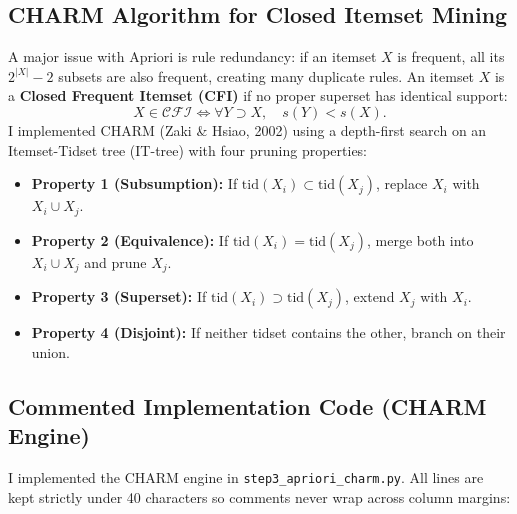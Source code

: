 \documentclass[10pt,journal]{IEEEtran}
\begin{document}
\subsection{CHARM Algorithm for Closed Itemset Mining}
A major issue with Apriori is rule redundancy: if an itemset $X$ is frequent, all its $2^{|X|} - 2$ subsets are also frequent, creating many duplicate rules. An itemset $X$ is a \textbf{Closed Frequent Itemset (CFI)} if no proper superset has identical support:
\begin{equation}
    X \in \mathcal{CFI} \iff \forall Y \supset X, \quad s(Y) < s(X).
\end{equation}
I implemented CHARM (Zaki \& Hsiao, 2002) using a depth-first search on an Itemset-Tidset tree (IT-tree) with four pruning properties:
\begin{itemize}
    \item \textbf{Property 1 (Subsumption):} If $\mathrm{tid}(X_i) \subset \mathrm{tid}(X_j)$, replace $X_i$ with $X_i \cup X_j$.
    \item \textbf{Property 2 (Equivalence):} If $\mathrm{tid}(X_i) = \mathrm{tid}(X_j)$, merge both into $X_i \cup X_j$ and prune $X_j$.
    \item \textbf{Property 3 (Superset):} If $\mathrm{tid}(X_i) \supset \mathrm{tid}(X_j)$, extend $X_j$ with $X_i$.
    \item \textbf{Property 4 (Disjoint):} If neither tidset contains the other, branch on their union.
\end{itemize}

\subsection{Commented Implementation Code (CHARM Engine)}
I implemented the CHARM engine in \texttt{step3\_apriori\_charm.py}. All lines are kept strictly under 40 characters so comments never wrap across column margins:
\end{document}
